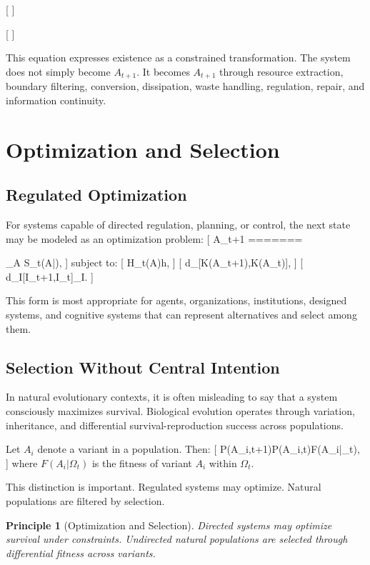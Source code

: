 \documentclass[11pt,a4paper]{article}
\newtheorem{principle}{Principle}
\newcommand{\argmax}{\operatorname*{arg,max}}
\begin{document}
[
]

[
]

This equation expresses existence as a constrained transformation. The system does not simply become $A_{t+1}$. It becomes $A_{t+1}$ through resource extraction, boundary filtering, conversion, dissipation, waste handling, regulation, repair, and information continuity.

\section{Optimization and Selection}

\subsection{Regulated Optimization}

For systems capable of directed regulation, planning, or control, the next state may be modeled as an optimization problem:
[
A_{t+1}
=======

\argmax_A S_t(A|\Omega),
]
subject to:
[
H_t(A)\leq h,
]
[
d_{\Omega}[K(A_{t+1}),K(A_t)]\leq\theta,
]
[
d_I[I_{t+1},I_t]\leq\theta_I.
]

This form is most appropriate for agents, organizations, institutions, designed systems, and cognitive systems that can represent alternatives and select among them.

\subsection{Selection Without Central Intention}

In natural evolutionary contexts, it is often misleading to say that a system consciously maximizes survival. Biological evolution operates through variation, inheritance, and differential survival-reproduction success across populations.

Let $A_i$ denote a variant in a population. Then:
[
P(A_i,t+1)\propto P(A_i,t)\cdot F(A_i|\Omega_t),
]
where $F(A_i|\Omega_t)$ is the fitness of variant $A_i$ within $\Omega_t$.

This distinction is important. Regulated systems may optimize. Natural populations are filtered by selection.

\begin{principle}[Optimization and Selection]
Directed systems may optimize survival under constraints. Undirected natural populations are selected through differential fitness across variants.
\end{principle}
\end{document}
